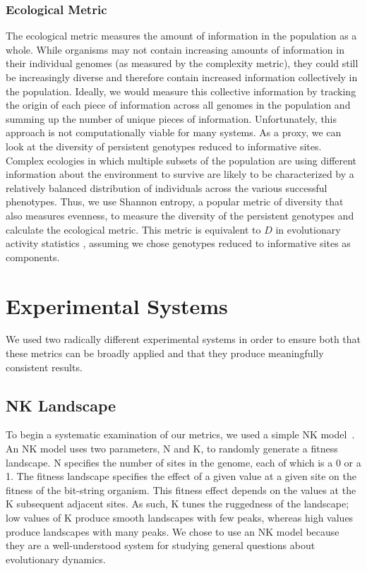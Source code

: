 \documentclass[letterpaper]{article}
\begin{document}
\subsubsection{Ecological Metric}
The ecological metric measures the amount of information in the population as a whole. While organisms may not contain increasing amounts of information in their individual genomes (as measured by the complexity metric), they could still be increasingly diverse and therefore contain increased information collectively in the population. Ideally, we would measure this collective information by tracking the origin of each piece of information across all genomes in the population and summing up the number of unique pieces of information. Unfortunately, this approach is not computationally viable for many systems. As a proxy, we can look at the diversity of persistent genotypes reduced to informative sites. Complex ecologies in which multiple subsets of the population are using different information about the environment to survive are likely to be characterized by a relatively balanced distribution of individuals across the various successful phenotypes. Thus, we use Shannon entropy, a popular metric of diversity that also measures evenness, to measure the diversity of the persistent genotypes and calculate the ecological metric. This metric is equivalent to $D$ in evolutionary activity statistics \citep{bedau_comparison_1997}, assuming we chose genotypes reduced to informative sites as components.

\section{Experimental Systems}

We used two radically different experimental systems in order to ensure both that these metrics can be broadly applied and that they produce meaningfully consistent results.

\subsection{NK Landscape}
To begin a systematic examination of our metrics, we used a simple NK model~\citep{kauffman_towards_1987}. An NK model uses two parameters, N and K, to randomly generate a fitness landscape. N specifies the number of sites in the genome, each of which is a 0 or a 1. The fitness landscape specifies the effect of a given value at a given site on the fitness of the bit-string organism. This fitness effect depends on the values at the K subsequent adjacent sites. As such, K tunes the ruggedness of the landscape; low values of K produce smooth landscapes with few peaks, whereas high values produce landscapes with many peaks. We chose to use an NK model because they are a well-understood system for studying general questions about evolutionary dynamics.
\end{document}
